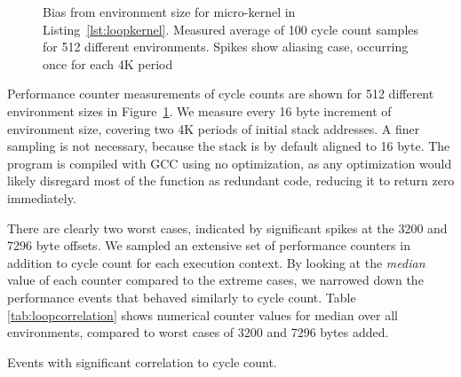 \documentclass[a4paper,10pt,twocolumn,twoside]{article}
\newcommand{\perfctr}[1] {
  {\lowercase{#1}}
}
\begin{document}
\begin{figure}[t]
  \caption{Bias from environment size for micro-kernel in Listing~\ref{lst:loopkernel}. Measured average of 100 cycle count samples for 512 different environments. Spikes show aliasing case, occurring once for each 4K period}
  \label{fig:envbias}
\end{figure}

Performance counter measurements of cycle counts are shown for 512 different environment sizes in Figure~\ref{fig:envbias}.
We measure every 16 byte increment of environment size, covering two 4K periods of initial stack addresses.
A finer sampling is not necessary, because the stack is by default aligned to 16 byte.
The program is compiled with {\small{GCC}} using no optimization, as any optimization would likely disregard most of the function as redundant code, reducing it to return zero immediately.

There are clearly two worst cases, indicated by significant spikes at the 3200 and 7296 byte offsets.
We sampled an extensive set of performance counters in addition to cycle count for each execution context.
By looking at the \emph{median} value of each counter compared to the extreme cases, we narrowed down the performance events that behaved similarly to cycle count.
Table \ref{tab:loopcorrelation} shows numerical counter values for median over all environments, compared to worst cases of 3200 and 7296 bytes added.

\begin{table}[t]
  \caption{Events with significant correlation to cycle count.}
  \label{tab:loopcorrelation}
  \centering
  \renewcommand{\tabcolsep}{1pt} %
  \pgfplotstabletypeset[
    font=\scriptsize,
    int detect, %
    col sep=comma,
    columns={Performance counter, Median, [index]3, [index]4},
    column type=r,
    columns/Performance counter/.style={
      string type, 
      column type=l,
      postproc cell content/.append code={
        \pgfkeysalso{@cell content=\perfctr{##1}}
      }
    },
    every head row/.style={
      output empty row,
      before row={\toprule
        Performance counter & Median & Spike 1 & Spike 2 \\
        },
      after row=\midrule,
    },
    every last row/.style={after row=\bottomrule}
  ]{bin/micro-kernel-comparison.csv}
\end{table}
\end{document}
